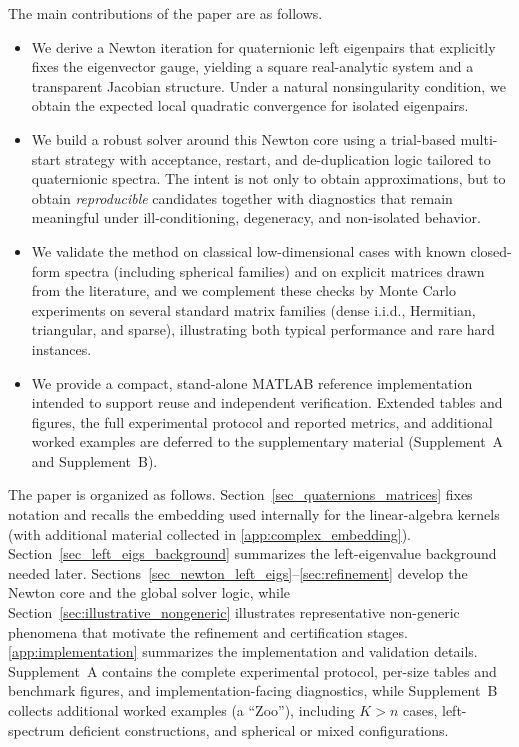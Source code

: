 \documentclass[preprint,12pt]{elsarticle}  %
\theoremstyle{definition}
\theoremstyle{definition}
\theoremstyle{definition}
\theoremstyle{definition}
\theoremstyle{definition}
\theoremstyle{remark}
\theoremstyle{remark}
\theoremstyle{remark}
\begin{document}
The main contributions of the paper are as follows.
\begin{itemize}
\item We derive a Newton iteration for quaternionic left eigenpairs that explicitly fixes the eigenvector gauge, yielding a square real-analytic system and a transparent Jacobian structure. Under a natural nonsingularity condition, we obtain the expected local quadratic convergence for isolated eigenpairs.

\item We build a robust solver around this Newton core using a trial-based multi-start strategy with acceptance, restart, and de-duplication logic tailored to quaternionic spectra. The intent is not only to obtain approximations, but to obtain \emph{reproducible} candidates together with diagnostics that remain meaningful under ill-conditioning, degeneracy, and
non-isolated behavior.

\item We validate the method on classical low-dimensional cases with known closed-form spectra (including spherical families) and on explicit matrices drawn from the literature, and we complement these checks by Monte Carlo experiments on several standard matrix families (dense i.i.d., Hermitian, triangular, and sparse), illustrating both typical performance and rare
hard instances.

\item We provide a compact, stand-alone MATLAB reference implementation intended to support reuse and independent verification. Extended tables and figures, the full experimental protocol and reported metrics, and additional worked examples are deferred to the supplementary material (Supplement~A and Supplement~B).
\end{itemize}

The paper is organized as follows. Section~\ref{sec_quaternions_matrices} fixes notation and recalls the embedding used internally for the linear-algebra kernels (with additional material collected in \ref{app:complex_embedding}). Section~\ref{sec_left_eigs_background} summarizes the left-eigenvalue background needed later. Sections~\ref{sec_newton_left_eigs}--\ref{sec:refinement}
develop the Newton core and the global solver logic, while Section~\ref{sec:illustrative_nongeneric}
illustrates representative non-generic phenomena that motivate the refinement and certification stages.
\ref{app:implementation} summarizes the implementation and validation details.
Supplement~A contains the complete experimental protocol, per-size tables and benchmark figures, and implementation-facing diagnostics, while
Supplement~B collects additional worked examples (a ``Zoo''), including $K>n$ cases, left-spectrum deficient constructions,
and spherical or mixed configurations.
\end{document}
